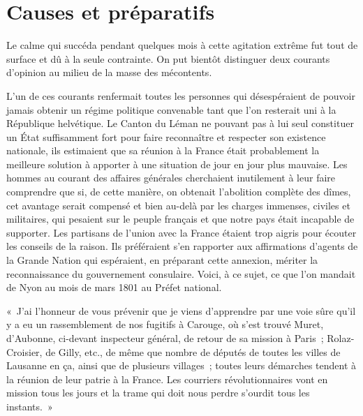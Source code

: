 \documentclass[french,twoside]{book} %
\newenvironment{quoteblock}%
  {\begin{quoting}}
  {\end{quoting}}
\newenvironment{quotebar}{%
    \def\FrameCommand{{\color{rubric!10!}\vrule width 0.5em} \hspace{0.9em}}%
    \def\OuterFrameSep{\itemsep} %
    \MakeFramed {\advance\hsize-\width \FrameRestore}
  }%
  {%
    \endMakeFramed
  }
\renewenvironment{quoteblock}%
  {%
    \savenotes
    \setstretch{0.9}
    \normalfont
    \begin{quotebar}
  }
  {%
    \end{quotebar}
    \spewnotes
  }
\begin{document}
\section[{Causes et préparatifs}]{Causes et préparatifs}
\noindent Le calme qui succéda pendant quelques mois à cette agitation extrême fut tout de surface et dû à la seule contrainte. On put bientôt distinguer deux courants d’opinion au milieu de la masse des mécontents.\par
L’un de ces courants renfermait toutes les personnes qui désespéraient de pouvoir jamais obtenir un régime politique convenable tant que l’on resterait uni à la République helvétique. Le Canton du Léman ne pouvant pas à lui seul constituer un État suffisamment fort pour faire reconnaître et respecter son existence nationale, ils estimaient que sa réunion à la France était probablement la meilleure solution à apporter à une situation de jour en jour plus mauvaise. Les hommes au courant des affaires générales cherchaient inutilement à leur faire comprendre que si, de cette manière, on obtenait l’abolition complète des dîmes, cet avantage serait compensé et bien au-delà par les charges immenses, civiles et militaires, qui pesaient sur le peuple français et que notre pays était incapable de supporter. Les partisans de l’union avec la France étaient trop aigris pour écouter les conseils de la raison. Ils préféraient s’en rapporter aux affirmations d’agents de la Grande Nation qui espéraient, en préparant cette annexion, mériter la reconnaissance du gouvernement consulaire. Voici, à ce sujet, ce que l’on mandait de Nyon au mois de mars 1801 au Préfet national.\par

\begin{quoteblock}
\noindent « J’ai l’honneur de vous prévenir que je viens d’apprendre par une voie sûre qu’il y a eu un rassemblement de nos fugitifs à Carouge, où s’est trouvé Muret, d’Aubonne, ci-devant inspecteur général, de retour de sa mission à Paris ; Rolaz-Croisier, de Gilly, etc., de même que nombre de députés de toutes les villes de Lausanne en ça, ainsi que de plusieurs villages ; toutes leurs démarches tendent à la réunion de leur patrie à la France. Les courriers révolutionnaires vont en mission tous les jours et la trame qui doit nous perdre s’ourdit tous les instants. »\end{quoteblock}
\end{document}
